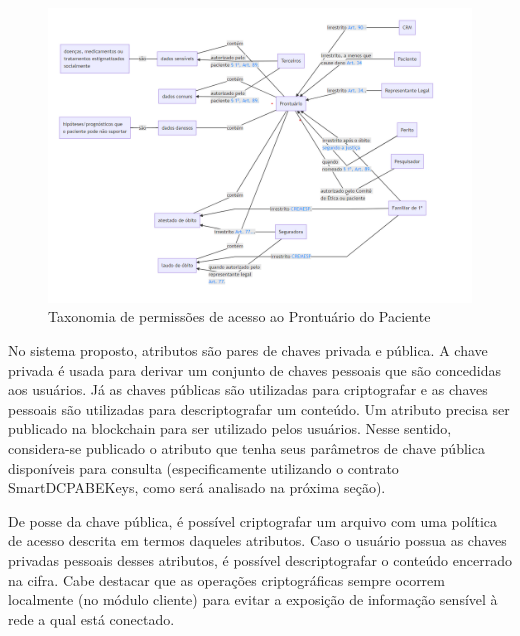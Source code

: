 \documentclass[a4paper,11pt]{article}
\begin{document}
\begin{figure}[h]
  \centering
  \includegraphics[width=\textwidth]{images/taxonomia-de-permissoes.png}
  \caption{Taxonomia de permissões de acesso ao Prontuário do Paciente} %
  \label{fig:taxonomiaPermissoes}
\end{figure}


No sistema proposto, atributos são pares de chaves privada e pública.
A chave privada é usada para derivar um conjunto de chaves pessoais que são concedidas aos usuários.
Já as chaves públicas são utilizadas para criptografar e as chaves pessoais são utilizadas para descriptografar um conteúdo.
Um atributo precisa ser publicado na blockchain para ser utilizado pelos usuários.
Nesse sentido, considera-se publicado o atributo que tenha seus parâmetros de chave pública disponíveis para consulta (especificamente utilizando o contrato SmartDCPABEKeys, como será analisado na próxima seção).

De posse da chave pública, é possível criptografar um arquivo com uma política de acesso descrita em termos daqueles atributos. Caso o usuário possua as chaves privadas pessoais desses atributos, é possível descriptografar o conteúdo encerrado na cifra.
Cabe destacar que as operações criptográficas sempre ocorrem localmente {\color{blue}(no módulo cliente)} para evitar a exposição de informação sensível à rede a qual está conectado.
\end{document}
